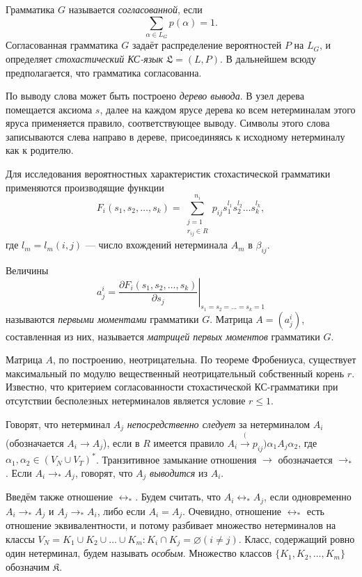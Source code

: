 \documentclass[11pt]{article}
\begin{document}
Грамматика $G$ называется \textit{согласованной}, если
\begin{equation}
    \sum_{\alpha \in L_G} p(\alpha) = 1.
\end{equation}
Согласованная грамматика $G$ задаёт распределение вероятностей $P$ на $L_G$, и определяет \textit{стохастический КС-язык} $\mathfrak{L} = (L, P)$. В дальнейшем всюду предполагается, что грамматика согласованна.

По выводу слова может быть построено \textit{дерево вывода}. В узел дерева помещается аксиома $s$, далее на каждом ярусе дерева ко всем нетерминалам этого яруса применяется правило, соответствующее выводу. Символы этого слова записываются слева направо в дереве, присоединяясь к исходному нетерминалу как к родителю.

Для исследования вероятностных характеристик стохастической грамматики применяются производящие функции
\begin{equation}
    F_i(s_1, s_2, \ldots, s_k) = \sum_{\substack{j = 1\\r_{ij} \in R}}^{n_i} p_{ij} s_1^{l_1} s_2^{l_2} \ldots s_k^{l_k},
\end{equation}
где $l_m = l_m(i,j)$ --- число вхождений нетерминала $A_m$ в $\beta_{ij}$.

Величины
\begin{equation}
    a^i_j = \left. \frac{\partial F_i(s_1, s_2, \ldots, s_k)}{\partial s_j} \right|_{s_1 = s_2 = \ldots = s_k = 1}
\end{equation}
называются \textit{первыми моментами} грамматики $G$. Матрица $A = (a^i_j)$, составленная из них, называется \textit{матрицей первых моментов} грамматики $G$.


Матрица $A$, по построению, неотрицательна. По теореме Фробениуса,
существует максимальный по модулю вещественный неотрицательный собственный корень $r$. Известно, что критерием согласованности стохастической КС-грамматики при отсутствии бесполезных нетерминалов является условие $r \le 1$.

Говорят, что нетерминал $A_j$ \textit{непосредственно следует} за нетерминалом $A_i$ (обозначается $A_i \rightarrow A_j$), если в $R$ имеется правило $A_i \xrightarrow(p_{ij}) \alpha_1 A_j \alpha_2$, где $\alpha_1, \alpha_2 \in (V_N \cup V_T)^*$. Транзитивное замыкание отношения $\rightarrow$ обозначается $\rightarrow_*$. Если $A_i \rightarrow_* A_j$, говорят, что $A_j$ \textit{выводится} из $A_i$.

Введём также отношение $\leftrightarrow_*$. Будем считать, что $A_i \leftrightarrow_* A_j$, если одновременно $A_i \rightarrow_* A_j$ и $A_j \rightarrow_* A_i$, либо если $A_i = A_j$. Очевидно, отношение $\leftrightarrow_*$ есть отношение эквивалентности, и потому разбивает множество нетерминалов на классы $V_N = K_1 \cup K_2 \cup \ldots \cup K_m : K_i \cap K_j = \varnothing (i \neq j)$. Класс, содержащий ровно один нетерминал, будем называть \textit{особым}. Множество классов $\{K_1, K_2, \ldots, K_m\}$ обозначим $\mathfrak{K}$.
\end{document}
